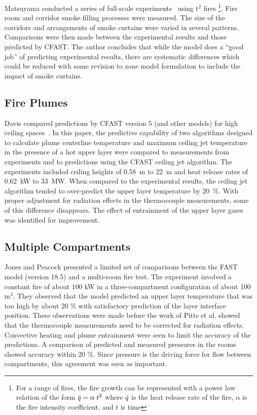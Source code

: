 Matsuyama conducted a series of full-scale experiments~\cite{Matsuyama:2000} using t$^2$ fires \footnote{For a range of fires, the fire growth can be represented with a power law relation of the form $\dot{q} = \alpha \; t^2$ where $\dot{q}$ is the heat
release rate of the fire, $\alpha$ is the fire intensity coefficient, and $t$ is time}. Fire room and corridor smoke filling processes were measured. The size of the corridors and arrangements of smoke curtains were varied in several patterns. Comparisons were then made between the experimental results and those predicted by CFAST. The author concludes that while the model does a ``good job'' of predicting experimental results, there are systematic differences which could be reduced with some revision to zone model formulation to include the impact of smoke curtains.

\subsection{Fire Plumes}

Davis compared predictions by CFAST version 5 (and other models) for high ceiling spaces~\cite{Valid:Davis_Plumes}. In this paper, the predictive capability of two algorithms designed to calculate plume centerline temperature and maximum ceiling jet temperature in the presence of a hot upper layer were compared to measurements from experiments and to predictions using the CFAST ceiling jet algorithm. The experiments included ceiling heights of 0.58~m to 22~m and heat release rates of 0.62~kW to 33~MW. When compared to the experimental results, the ceiling jet algorithm tended to over-predict the upper layer temperature by 20~\%. With proper adjustment for radiation effects in the thermocouple measurements, some of this difference disappears. The effect of entrainment of the upper layer gases was identified for improvement.

\subsection{Multiple Compartments}
\label{secMultipleCompartments}

Jones and Peacock \cite{Valid:Jones} presented a limited set of comparisons between the FAST model (version 18.5) and a multi-room fire test. The experiment involved a constant fire of about 100 kW in a three-compartment configuration of about 100 m$^3$. They observed that the model predicted an upper layer temperature that was too high by about 20 \% with satisfactory prediction of the layer interface position. These observations were made before the work of Pitts et al. \cite{Valid:Pitts} showed that the thermocouple measurements need to be corrected for radiation effects. Convective heating and plume entrainment were seen to limit the accuracy of the predictions. A comparison of predicted and measured pressures in the rooms showed accuracy within 20 \%. Since pressure is the driving force for flow between compartments, this agreement was seen as important.

